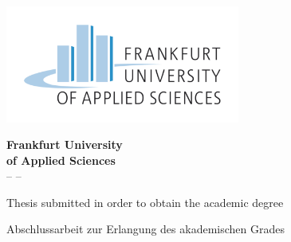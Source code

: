\thispagestyle{empty}

\thispagestyle{empty}
\begin{titlepage}


  \vspace*{-3,5cm}
  \begin{center}
    \includegraphics[width=7.7cm]{Figures/fra-uas_logo} \\ 
  \end{center}

  \begin{center}
    \vspace{0.1cm}
    \LARGE \textbf{Frankfurt University\\ of Applied Sciences}\\
    \vspace{0.4cm}
    \Large -- \Faculty --
  \end{center}

  \vfill

  \begin{center}
    \huge \textbf{\ThesisTitle}   %
  \end{center} 

  \vfill

  \ifdefined\ThesisLanguageIsEnglish 
  \begin{center}
    \Large Thesis submitted in order to obtain the academic degree\\
    \vspace{0.3cm}
    \Large \ThesisDegree   %
  \end{center}
  \else
  \begin{center}
    \Large Abschlussarbeit zur Erlangung des akademischen Grades\\
    \vspace{0.3cm}
    \Large \ThesisDegree   %
  \end{center}
  \fi


\end{titlepage}
